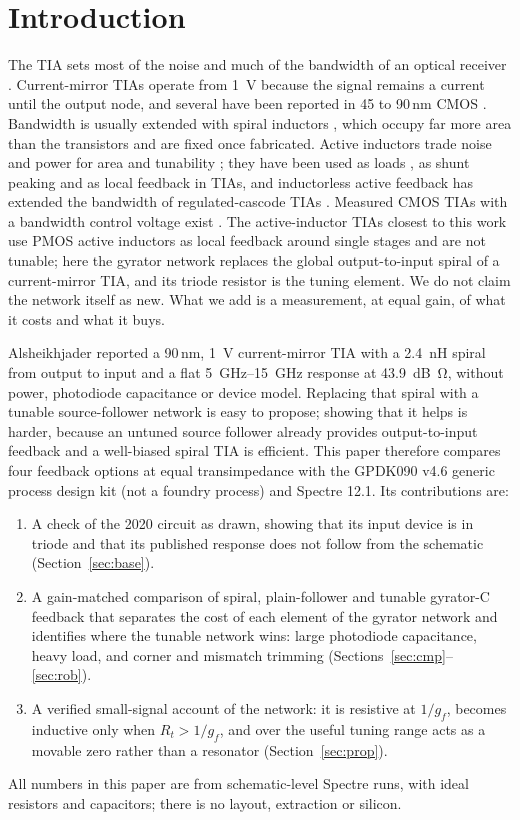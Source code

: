 \documentclass[conference]{IEEEtran}
\begin{document}
\section{Introduction}
The TIA sets most of the noise and much of the bandwidth of an optical receiver \cite{razavi,sackinger}. Current-mirror TIAs operate from \SI{1}{V} because the signal remains a current until the output node, and several have been reported in 45 to 90\,nm CMOS \cite{zohoori,hassan,issa,alyas,shaaban}. Bandwidth is usually extended with spiral inductors \cite{mohanbw}, which occupy far more area than the transistors and are fixed once fabricated. Active inductors trade noise and power for area and tunability \cite{yuan,razaviai}; they have been used as loads \cite{zohoori}, as shunt peaking \cite{shaaban,kumar} and as local feedback \cite{alberwari,alyas} in TIAs, and inductorless active feedback has extended the bandwidth of regulated-cascode TIAs \cite{chen16}. Measured CMOS TIAs with a bandwidth control voltage exist \cite{hwang,chien}. The active-inductor TIAs closest to this work \cite{alberwari,alyas} use PMOS active inductors as local feedback around single stages and are not tunable; here the gyrator network replaces the global output-to-input spiral of a current-mirror TIA, and its triode resistor is the tuning element. We do not claim the network itself as new. What we add is a measurement, at equal gain, of what it costs and what it buys.

Alsheikhjader \cite{baseline} reported a 90\,nm, \SI{1}{V} current-mirror TIA with a \SI{2.4}{nH} spiral from output to input and a flat \SIrange{5}{15}{GHz} response at \SI{43.9}{dB\ohm}, without power, photodiode capacitance or device model. Replacing that spiral with a tunable source-follower network is easy to propose; showing that it helps is harder, because an untuned source follower already provides output-to-input feedback and a well-biased spiral TIA is efficient. This paper therefore compares four feedback options at equal transimpedance with the GPDK090 v4.6 generic process design kit (not a foundry process) and Spectre 12.1. Its contributions are:
\begin{enumerate}
\item A check of the 2020 circuit as drawn, showing that its input device is in triode and that its published response does not follow from the schematic (Section~\ref{sec:base}).
\item A gain-matched comparison of spiral, plain-follower and tunable gyrator-C feedback that separates the cost of each element of the gyrator network and identifies where the tunable network wins: large photodiode capacitance, heavy load, and corner and mismatch trimming (Sections~\ref{sec:cmp}--\ref{sec:rob}).
\item A verified small-signal account of the network: it is resistive at $1/g_f$, becomes inductive only when $R_t>1/g_f$, and over the useful tuning range acts as a movable zero rather than a resonator (Section~\ref{sec:prop}).
\end{enumerate}
All numbers in this paper are from schematic-level Spectre runs, with ideal resistors and capacitors; there is no layout, extraction or silicon.
\end{document}
